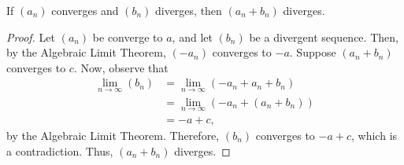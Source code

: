 \documentclass[12pt]{article}
\begin{document}
\newpage
{} If $(a_n)$ converges and $(b_n)$ diverges, then $(a_n + b_n)$ diverges.
\begin{proof}
    Let $(a_n)$ be converge to $a$, and let $(b_n)$ be a divergent sequence. Then, by the Algebraic Limit Theorem, $(-a_n)$ converges to $-a$. Suppose $(a_n + b_n)$ converges to $c$. Now, observe that
    \begin{align*}
        \lim\limits_{n\to\infty} (b_n) &= \lim\limits_{n\to\infty} (-a_n + a_n + b_n) \\
                                       &= \lim\limits_{n\to\infty} (-a_n + (a_n + b_n)) \\
                                       &= -a + c,
    \end{align*}
    by the Algebraic Limit Theorem.
    Therefore, $(b_n)$ converges to $-a+c$, which is a contradiction. Thus, $(a_n + b_n)$ diverges.
\end{proof}
    
\end{document}
